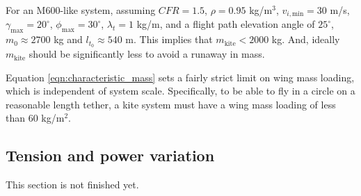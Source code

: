 \documentclass[11pt]{amsart}
\newcommand{\eff}{\mathrm{eff}}
\newcommand{\kite}{\mathrm{kite}}
\newcommand{\mx}{\mathrm{max}}
\newcommand{\mn}{\mathrm{min}}
\newcommand{\total}{\mathrm{tot}}
\newcommand{\mass}{\mathrm{mass}}
\newcommand{\power}{\mathrm{power}}
\newcommand{\powertrain}{\mathrm{powertrain}}
\begin{document}
{{{For an M600-like system, assuming $\mathit{CFR} = 1.5$, $\rho = 0.95$
kg/m$^3$, $v_{i,\mn} = 30$ m/s, $\gamma_{\mx} = 20^{\circ}$,
$\phi_{\mx} = 30^{\circ}$, $\lambda_t = 1$ kg/m, and a flight path
elevation angle of $25^{\circ}$, $m_0 \approx 2700$ kg and
$l_{t_0} \approx 540$ m. This implies that $m_{\kite} < 2000$ kg.
And, ideally $m_{\kite}$ should be significantly less to avoid a
runaway in mass.

Equation \ref{eqn:characteristic_mass} sets a fairly strict limit on
wing mass loading, which is independent of system scale.
Specifically, to be able to fly in a circle on a reasonable length
tether, a kite system must have a wing mass loading of less than 60
kg/m$^2$.

\subsection{Tension and power variation}
This section is not finished yet.









}}}
\end{document}
